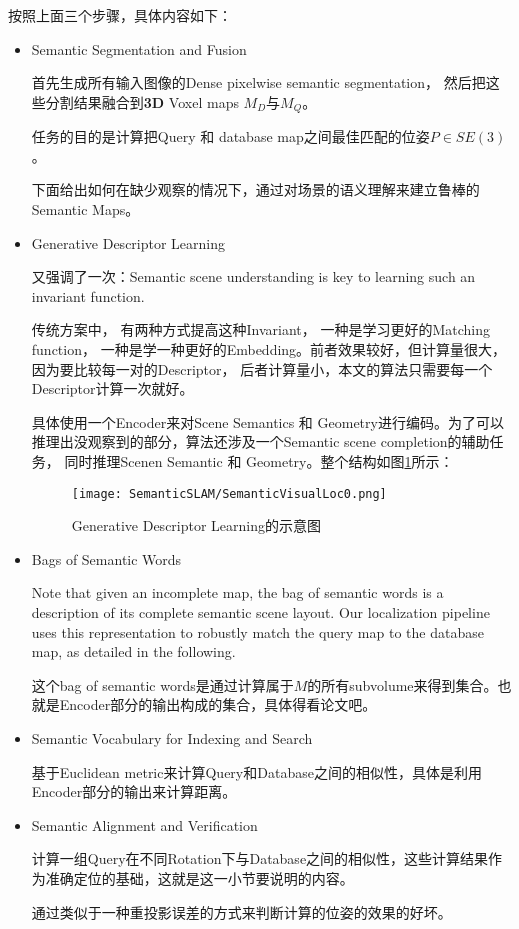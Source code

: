 按照上面三个步骤，具体内容如下：
\begin{itemize}
\item Semantic Segmentation and Fusion

首先生成所有输入图像的Dense pixelwise semantic segmentation， 然后把这些分割结果融合到\textbf{3D} Voxel maps $M_D$与$M_Q$。 

任务的目的是计算把Query 和 database map之间最佳匹配的位姿$P \in SE(3)$。

下面给出如何在缺少观察的情况下，通过对场景的语义理解来建立鲁棒的Semantic Maps。

\item Generative Descriptor Learning

又强调了一次：Semantic scene understanding is key to learning such an invariant function.

传统方案中， 有两种方式提高这种Invariant， 一种是学习更好的Matching function， 一种是学一种更好的Embedding。前者效果较好，但计算量很大，因为要比较每一对的Descriptor， 后者计算量小，本文的算法只需要每一个Descriptor计算一次就好。

具体使用一个Encoder来对Scene Semantics 和 Geometry进行编码。为了可以推理出没观察到的部分，算法还涉及一个Semantic scene completion的辅助任务， 同时推理Scenen Semantic 和 Geometry。整个结构如图\ref{SemanticVisualLoc0}所示：
\begin{figure}[!hbtp]
\centering
\texttt{[image: SemanticSLAM/SemanticVisualLoc0.png]}
\caption{Generative Descriptor Learning的示意图}
\label{SemanticVisualLoc0}
\end{figure}

\item Bags of Semantic Words

 Note that given an incomplete map, the bag of semantic words is a description of its complete
semantic scene layout. Our localization pipeline uses this representation to robustly match the query map to the database map, as detailed in the following.

这个bag of semantic words是通过计算属于$M$的所有subvolume来得到集合。也就是Encoder部分的输出构成的集合，具体得看论文吧。

\item Semantic Vocabulary for Indexing and Search

基于Euclidean metric来计算Query和Database之间的相似性，具体是利用Encoder部分的输出来计算距离。

\item Semantic Alignment and Verification

计算一组Query在不同Rotation下与Database之间的相似性，这些计算结果作为准确定位的基础，这就是这一小节要说明的内容。

通过类似于一种重投影误差的方式来判断计算的位姿的效果的好坏。

\end{itemize}

